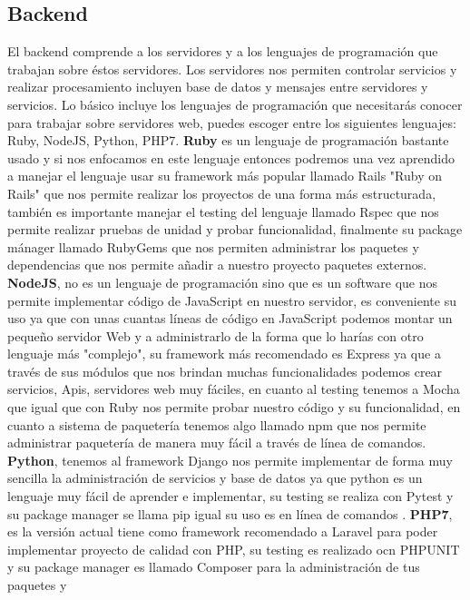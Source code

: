 \documentclass[twocolumns,a4paper]{IEEEtran}
\begin{document}
\subsection{Backend}
El backend comprende a los servidores y a los lenguajes de programación que
trabajan sobre éstos servidores. Los servidores nos permiten controlar
servicios y realizar procesamiento incluyen base de datos y mensajes entre
servidores y servicios.
Lo básico incluye los lenguajes de programación que necesitarás conocer para
trabajar sobre servidores web, puedes escoger entre los siguientes lenguajes:
Ruby, NodeJS, Python, PHP7. \textbf{Ruby} es un lenguaje de programación
bastante usado y si nos enfocamos en este lenguaje entonces podremos una vez
aprendido a manejar el lenguaje usar su framework más popular llamado Rails
"Ruby on Rails" que nos permite realizar los proyectos de una forma más
estructurada, también es importante manejar el testing del lenguaje llamado
Rspec que nos permite realizar pruebas de unidad y probar funcionalidad,
finalmente su package mánager llamado RubyGems que nos permiten administrar los
paquetes y dependencias que nos permite añadir a nuestro proyecto paquetes
externos.  \textbf{NodeJS}, no es un lenguaje de programación sino que es un
software que nos permite implementar código de JavaScript en nuestro servidor,
es conveniente su uso ya que con unas cuantas líneas de código en JavaScript
podemos montar un pequeño servidor Web y a administrarlo de la forma que lo
harías con otro lenguaje más "complejo", su framework más recomendado es
Express ya que a través de sus módulos que nos brindan muchas funcionalidades
podemos crear servicios, Apis, servidores web muy fáciles, en cuanto al testing
tenemos a Mocha que igual que con Ruby nos permite probar nuestro código y su
funcionalidad, en cuanto a sistema de paquetería tenemos algo llamado npm que
nos permite administrar paquetería de manera muy fácil a través de línea de
comandos. \textbf{Python}, tenemos al framework Django nos permite implementar
de forma muy sencilla la administración de servicios y base de datos ya que
python es un lenguaje muy fácil de aprender e implementar, su testing se
realiza con Pytest y su package manager se llama pip igual su uso es en línea
de comandos \cite{PythonTuto:2018:online} \cite{IntroPython2008}
\cite{Python3Descubierto} \cite{IntroPython2008}.  \textbf{PHP7}, es la versión
actual tiene como framework recomendado a Laravel para poder implementar
proyecto de calidad con PHP, su testing es realizado ocn PHPUNIT y su package
manager es llamado Composer para la administración de tus paquetes y
\end{document}
